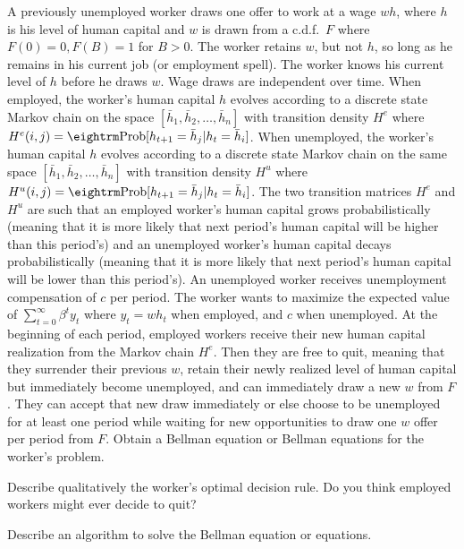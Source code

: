 \medskip
{} 
\medskip
\noindent  A previously  unemployed worker draws one offer to work at a wage
$w h$, where $h$ is his level of human capital and $w$ is  drawn from a c.d.f.\ $F$ where $F(0) = 0, F(B) =1$ for $B >0$.  The worker retains
$w$, but not $h$, so long as he remains in his current job (or employment spell). The worker knows his current level of $h$ before he draws
 $w$.  Wage draws are independent over time.
When employed, the worker's human capital $h$ evolves according to a discrete state  Markov chain on the space
$[\bar h_1, \bar h_2, \ldots, \bar h_n]$ with transition density $H^e$
where $H^e(i,j) = {\rm Prob }[h_{t+1} = \bar h_j | h_t = \bar h_i]$. When unemployed, the worker's human capital $h$ evolves according to a discrete state  Markov chain   on the same space
$[\bar h_1, \bar h_2, \ldots, \bar h_n]$ with transition density $H^u$
where $H^u(i,j) = {\rm Prob} [h_{t+1} = \bar h_j | h_t = \bar h_i]$. The two transition matrices $H^e$ and $H^u$ are such that an employed worker's human capital
grows probabilistically (meaning that it is more likely that next period's human capital will be higher than this period's) and an unemployed worker's human capital decays probabilistically (meaning that it is more likely that next period's human capital will be lower than this period's).
An unemployed worker receives unemployment compensation of $c$ per period. The worker wants to maximize the expected value of $\sum_{t=0}^\infty \beta^t y_t $ where $y_t = w h_t$ when employed, and
$c$ when unemployed.   At the beginning of each period, employed workers receive their new human capital realization from the Markov chain
$H^e$. Then they are free to quit, meaning that they surrender their previous $w$, retain their newly realized level of human capital but immediately
become unemployed,
and can immediately draw a new $w$ from $F$.  They can accept that new draw immediately or else choose to be unemployed for at least one period while
waiting for  new opportunities to draw one $w$ offer per period from $F$.
\medskip
{}  Obtain a Bellman equation or Bellman equations for the worker's problem.

\medskip
{} Describe qualitatively the  worker's optimal decision rule.  Do you think employed workers might ever decide to quit?

\medskip
{} Describe an algorithm to solve the Bellman equation or equations.




